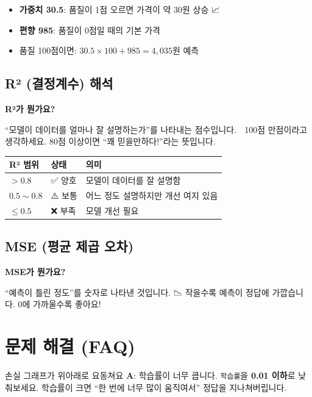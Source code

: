 \documentclass[11pt,a4paper]{article}
\begin{document}
\begin{itemize}
    \item \textbf{가중치 30.5}: 품질이 1점 오르면 가격이 약 30원 상승 📈
    \item \textbf{편향 985}: 품질이 0점일 때의 기본 가격
    \item 품질 100점이면: $30.5 \times 100 + 985 = 4,035$원 예측
\end{itemize}

\subsection{R² (결정계수) 해석}

\begin{tipbox}
\textbf{R²가 뭔가요?}

``모델이 데이터를 얼마나 잘 설명하는가''를 나타내는 점수입니다. 🎯
100점 만점이라고 생각하세요. 80점 이상이면 ``꽤 믿을만하다!''라는 뜻입니다.
\end{tipbox}

\begin{center}
\begin{tabular}{lll}
\toprule
\textbf{R² 범위} & \textbf{상태} & \textbf{의미} \\
\midrule
$> 0.8$ & ✅ 양호 & 모델이 데이터를 잘 설명함 \\
$0.5 \sim 0.8$ & ⚠️ 보통 & 어느 정도 설명하지만 개선 여지 있음 \\
$\leq 0.5$ & ❌ 부족 & 모델 개선 필요 \\
\bottomrule
\end{tabular}
\end{center}

\subsection{MSE (평균 제곱 오차)}

\begin{tipbox}
\textbf{MSE가 뭔가요?}

``예측이 틀린 정도''를 숫자로 나타낸 것입니다. 📉
작을수록 예측이 정답에 가깝습니다. 0에 가까울수록 좋아요!
\end{tipbox}

\section{문제 해결 (FAQ)}

\begin{faqbox}{손실 그래프가 위아래로 요동쳐요}
\textbf{A}: 학습률이 너무 큽니다. 
\texttt{학습률}을 \textbf{0.01 이하}로 낮춰보세요. 
학습률이 크면 ``한 번에 너무 많이 움직여서'' 정답을 지나쳐버립니다.
\end{faqbox}
\end{document}
